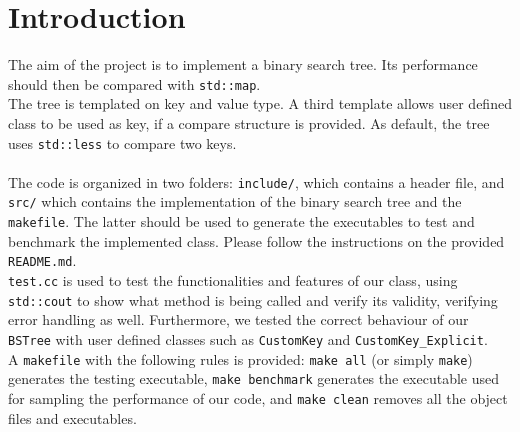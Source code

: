 \documentclass[12pt,a4paper,openany]{scrartcl}
\begin{document}
	
	\maketitle
	
	
\section{Introduction}
	The aim of the project is to implement a binary search tree. Its performance should then be compared with \texttt{std::map}.\\
    The tree is templated on key and value type. A third template allows user defined class to be used as key, if a compare structure is provided. As default, the tree uses \texttt{std::less} to compare two keys.\\\\
    The code is organized in two folders: \texttt{include/}, which contains a header file, and \texttt{src/} which contains the implementation of the binary search tree and the \texttt{makefile}. The latter should be used to generate the executables to test and benchmark the implemented class. Please follow the instructions on the provided \texttt{README.md}.\\
    \texttt{test.cc} is used to test the functionalities and features of our class, using \texttt{std::cout} to show what method is being called and verify its validity, verifying error handling as well. Furthermore, we tested the correct behaviour of our \texttt{BSTree} with user defined classes such as \texttt{CustomKey} and \texttt{CustomKey\_Explicit}.\\
     A \texttt{makefile} with the following rules is provided: \texttt{make all} (or simply \texttt{make}) generates the testing executable, \texttt{make benchmark} generates the executable used for sampling the performance of our code, and \texttt{make clean} removes all the object files and executables.
	
\end{document}
